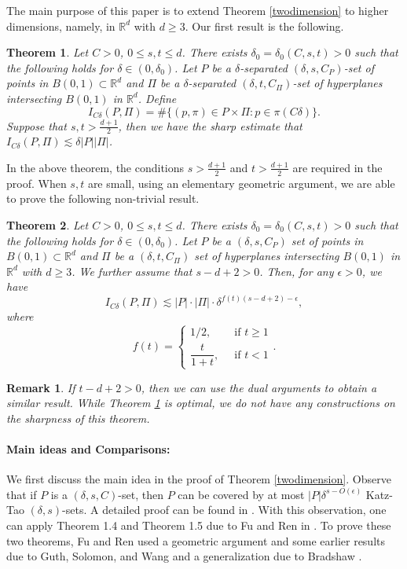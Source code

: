 \documentclass[11pt]{article}
\newtheorem{theorem}{Theorem}[section]
\newtheorem{remark}{Remark}[section]
\newcommand{\1}{\mathbf{1}}
\begin{document}
The main purpose of this paper is to extend Theorem \ref{twodimension} to higher dimensions, namely, in $\mathbb{R}^d$ with $d\ge 3$. Our first result is the following.
\begin{theorem}\label{main-theorem}Let $C>0$, $0\le s, t\le d$. There exists $\delta_0=\delta_0(C, s, t)>0$ such that the following holds for $\delta\in (0, \delta_0)$.
    Let $P$ be a $\delta$-separated $(\delta, s, C_P)$-set of points in $B(0, 1)\subset \mathbb{R}^d$ and $\Pi$ be a $\delta$-separated $(\delta, t, C_\Pi)$-set of hyperplanes intersecting $B(0, 1)$ in $\mathbb{R}^d$. Define
    \[I_{C\delta}(P, \Pi)=\#\{(p, \pi)\in P\times \Pi\colon p\in \pi(C\delta)\}.\] Suppose that $s, t > \frac{d+1}{2}$,
    then we have the sharp estimate that $I_{C\delta}(P, \Pi)\lesssim \delta |P||\Pi|$.
\end{theorem}
In the above theorem, the conditions $s > \frac{d+1}{2}$ and $t > \frac{d+1}{2}$ are required in the proof. When $s, t$ are small, using an elementary geometric argument, we are able to prove the following non-trivial result.
\begin{theorem}\label{CSbound}Let $C>0$, $0\le s, t\le d$. There exists $\delta_0=\delta_0(C, s, t)>0$ such that the following holds for $\delta\in (0, \delta_0)$.
    Let $P$ be a $(\delta,s,C_P)$ set of points in $B(0, 1)\subset \mathbb{R}^d$ and $\Pi$ be a $(\delta,t,C_\Pi)$ set of hyperplanes intersecting $B(0, 1)$ in $\mathbb{R}^d$ with $d \geq 3$. We further assume that $s-d+2 >0$. Then, for any $\epsilon >0$, we have
    \[I_{C\delta}(P,\Pi)\lesssim  |P|\cdot|\Pi|\cdot \delta^{f(t)(s-d+2) - \epsilon},\] where  \[
        f(t) =
        \begin{cases}
            1/2,  ~           & \text{ if } t\ge 1 \\
            \dfrac{t}{1+t}, ~ & \text{ if } t<1
        \end{cases}.\]
\end{theorem}
\begin{remark}
    If $t-d+2 > 0$, then we can use the dual arguments to obtain a similar result. While Theorem \ref{main-theorem} is optimal, we do not have any constructions on the sharpness of this theorem.
\end{remark}

\paragraph{Main ideas and Comparisons:} We first discuss the main idea in the proof of Theorem \ref{twodimension}. Observe that if $P$ is a $(\delta, s, C)$-set, then $P$ can be covered by at most $|P|\delta^{s-O(\epsilon)}$ Katz-Tao $(\delta, s)$-sets. A detailed proof can be found in \cite[Lemma 3.5]{motmot}. With this observation, one can apply Theorem 1.4 and Theorem 1.5 due to Fu and Ren in \cite{FuRen}. To prove these two theorems, Fu and Ren used a geometric argument and some earlier results due to Guth, Solomon, and Wang \cite{GSW} and a generalization due to Bradshaw \cite{PB}.
\end{document}
